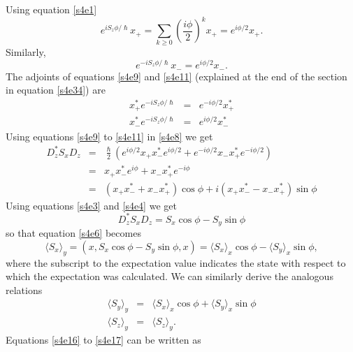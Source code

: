 \documentclass{article}
\numberwithin{equation}{section}
\newcommand{\qev}[1]{\langle #1 \rangle} %
\theoremstyle{plain}
\numberwithin{thm}{section}
\theoremstyle{plain}
\numberwithin{prop}{section}
\theoremstyle{definition}
\numberwithin{defn}{section}
\theoremstyle{remark}
\begin{document}
Using equation \eqref{s4e1}
\begin{equation}\label{s4e10}
e^{iS_z\phi/\hslash}x_+ = 
\sum_{k \ge 0}\left(\frac{i\phi}{2}\right)^k x_+ = e^{i\phi/2}x_+.
\end{equation}
Similarly,
\begin{equation}\label{s4e11}
e^{-iS_z\phi/\hslash}x_- = e^{i\phi/2}x_-.
\end{equation}
The adjoints of equations \eqref{s4e9} and \eqref{s4e11} (explained at the
end of the section in equation \eqref{s4e34}) are
\begin{eqnarray}
x_+^\ast e^{-iS_z\phi/\hslash} &=& e^{-i\phi/2}x_+^\ast \label{s4e12} \\
x_-^\ast e^{-iS_z\phi/\hslash} &=& e^{i\phi/2}x_-^\ast \label{s4e13}
\end{eqnarray}
Using equations \eqref{s4e9} to \eqref{s4e11} in \eqref{s4e8} we get
\begin{eqnarray}
D_z^\ast S_x D_z &=& \frac{\hslash}{2}\left(e^{i\phi/2}x_+x_-^\ast e^{i\phi/2}
+ e^{-i\phi/2}x_-x_+^\ast e^{-i\phi/2}\right) \nonumber \\
 &=& x_+x_-^\ast e^{i\phi} + x_-x_+^\ast e^{-i\phi} \nonumber \\
 &=& (x_+x_-^\ast + x_-x_+^\ast)\cos\phi + i(x_+x_-^\ast - x_-x_+^\ast)\sin\phi
\label{s4e14}
\end{eqnarray}
Using equations \eqref{s4e3} and \eqref{s4e4} we get
\begin{equation}\label{s4e15}
D_z^\ast S_x D_z = S_x\cos\phi - S_y\sin\phi
\end{equation}
so that equation \eqref{s4e6} becomes
\begin{equation}\label{s4e16}
\qev{S_x}_y = (x, S_x\cos\phi - S_y\sin\phi, x) = \qev{S_x}_x\cos\phi -
\qev{S_y}_x\sin\phi,
\end{equation}
where the subscript to the expectation value indicates the state with respect
to which the expectation was calculated. We can similarly derive the analogous 
relations
\begin{eqnarray}
\qev{S_y}_y &=& \qev{S_x}_x\cos\phi + \qev{S_y}_x\sin\phi \label{s4e17} \\
\qev{S_z}_y &=& \qev{S_z}_y. \label{s4e18}
\end{eqnarray}
Equations \eqref{s4e16} to \eqref{s4e17} can be written as
\end{document}
